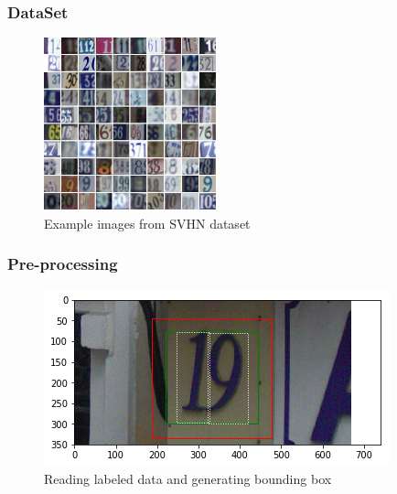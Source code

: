\documentclass[11.5pt,aspectratio=1610,xcolor={usenames,dvipsnames,table}]{beamer}
\begin{document}
\begin{frame}

\frametitle{DataSet}

\begin{figure}[!h]
	\includegraphics[width=\textwidth, height = 5cm]{dataset.png}
	\caption{Example images from SVHN dataset \cite{SVHN}}
\end{figure}

\end{frame}

\begin{frame}

\frametitle{Pre-processing}

\begin{figure}[!h]
\includegraphics[width=\textwidth]{19.png}
\caption{Reading labeled data and generating bounding box}

\end{figure}
\end{frame}
\end{document}
